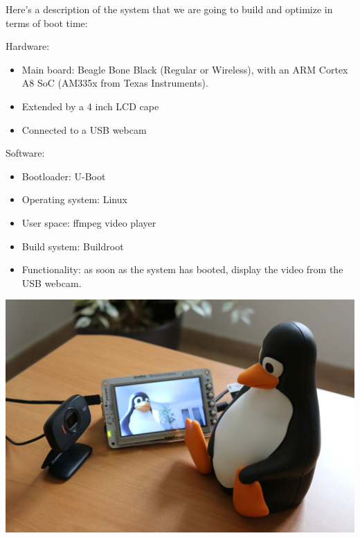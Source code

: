 
Here's a description of the system that we are going to build and
optimize in terms of boot time:

Hardware:
\begin{itemize}
\item Main board: Beagle Bone Black (Regular or Wireless), with an ARM
Cortex A8 SoC (AM335x from Texas Instruments).
\item Extended by a 4 inch LCD cape
\item Connected to a USB webcam
\end{itemize}

Software:
\begin{itemize}
\item Bootloader: U-Boot
\item Operating system: Linux
\item User space: ffmpeg video player
\item Build system: Buildroot
\item Functionality: as soon as the system has booted, display
      the video from the USB webcam.
\end{itemize}

\begin{center}
\includegraphics[width=\textwidth]{common/beaglecam.jpg}
\end{center}
